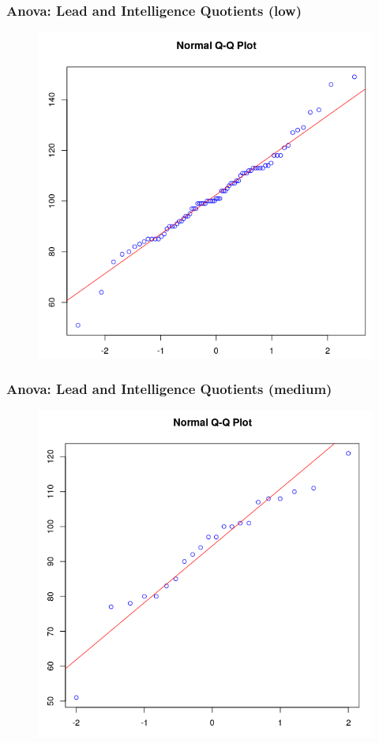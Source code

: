 \documentclass[xcolor=dvipsnames]{beamer} \usepackage{teachbeamer}
\begin{document}
\begin{frame}
  \frametitle{Anova: Lead and Intelligence Quotients (low)}
  \begin{figure}[h]
    \includegraphics[scale=0.35]{./diagrams/lead_l.png}
  \end{figure}
\end{frame}

\begin{frame}
  \frametitle{Anova: Lead and Intelligence Quotients (medium)}
  \begin{figure}[h]
    \includegraphics[scale=0.35]{./diagrams/lead_m.png}
  \end{figure}
\end{frame}
\end{document}
